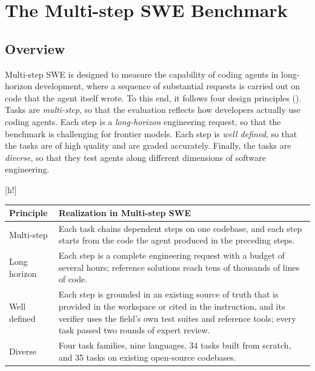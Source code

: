 \documentclass{article}
\makeatletter
\renewenvironment{table}
  {\setlength{\abovecaptionskip}{\@abovecaptionskip}%
   \setlength{\belowcaptionskip}{\@belowcaptionskip}%
   \@float{table}}
  {\end@float}
\newcommand{\bench}{Multi-step SWE\xspace}
\makeatother
\begin{document}
\section{The \bench Benchmark}
\label{sec:benchmark}

\subsection{Overview}
\label{sec:principles}

\bench is designed to measure the capability of coding agents in long-horizon
development, where a sequence of substantial requests is carried out on code
that the agent itself wrote. To this end, it follows four design principles
(). Tasks are \emph{multi-step}, so that the evaluation
reflects how developers actually use coding agents. Each step is a
\emph{long-horizon} engineering request, so that the benchmark is challenging
for frontier models. Each step is \emph{well defined}, so that the tasks are of
high quality and are graded accurately. Finally, the tasks are \emph{diverse},
so that they test agents along different dimensions of software engineering.

\begin{table}[h!]
  \centering
  \small
  \begin{tabularx}{\linewidth}{@{}l X@{}}
    \toprule
    Principle & Realization in \bench \\
    \midrule
    Multi-step & Each task chains dependent steps on one codebase, and each
      step starts from the code the agent produced in the preceding
      steps. \\
    Long horizon & Each step is a complete engineering request with a budget of
      several hours; reference solutions reach tens of thousands of lines of
      code. \\
    Well defined & Each step is grounded in an existing source of truth that is
      provided in the workspace or cited in the instruction, and its verifier
      uses the field's own test suites and reference tools; every task passed two rounds of expert
      review. \\
    Diverse & Four task families, nine languages, 34 tasks built from scratch,
      and 35 tasks on existing open-source codebases. \\
    \bottomrule
  \end{tabularx}
  \caption{Design principles of \bench and how each principle is realized.}
  \label{tab:principles}
\end{table}
\end{document}
